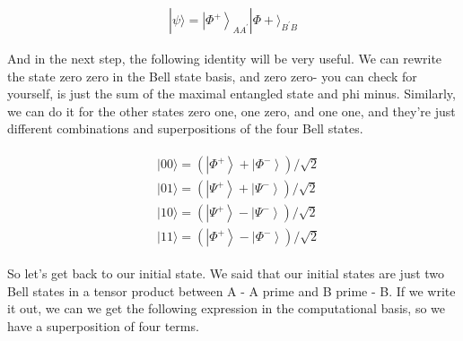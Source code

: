 \begin{align}
    |\psi\rangle=\left|\Phi^{+}\right\rangle_{A A^{\prime}}|\Phi+\rangle_{B^{\prime} B}
\end{align}

And in the next step, the following identity will be very useful. We can rewrite the state zero zero in the Bell state basis, and zero zero- you can check for yourself, is just the sum of the maximal entangled state  \ket{\Phi^+} and phi minus. Similarly, we can do it for the other states zero one, one zero, and one one, and they're just different combinations and superpositions of the four Bell states.

\begin{align}
    \begin{aligned}
&|00\rangle=\left(\left|\Phi^{+}\right\rangle+\left|\Phi^{-}\right\rangle\right) / \sqrt{2} \\
&|01\rangle=\left(\left|\Psi^{+}\right\rangle+\left|\Psi^{-}\right\rangle\right) / \sqrt{2} \\
&|10\rangle=\left(\left|\Psi^{+}\right\rangle-\left|\Psi^{-}\right\rangle\right) / \sqrt{2} \\
&|11\rangle=\left(\left|\Phi^{+}\right\rangle-\left|\Phi^{-}\right\rangle\right) / \sqrt{2}
\end{aligned}
\end{align}

So let's get back to our initial state. We said that our initial states are just two Bell states  \ket{\Phi^+} in a tensor product between A - A prime and B prime - B. If we write it out, we can we get the following expression in the computational basis, so we have a superposition of four terms. 

